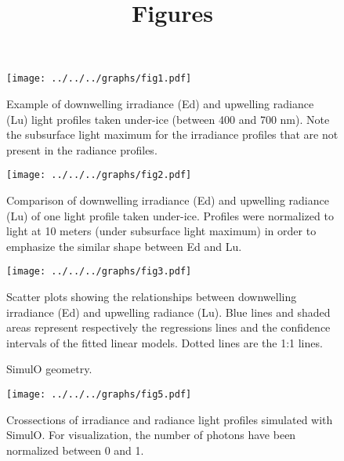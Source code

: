 \documentclass[12pt,a4paper]{scrartcl}
\title{Figures}
\date{}
\begin{document}
    \maketitle

     \begin{figure}[ht]
         \centering
         \texttt{[image: ../../../graphs/fig1.pdf]}
         \caption{Example of downwelling irradiance (Ed) and upwelling radiance (Lu) light profiles taken under-ice (between 400 and 700 nm). Note the subsurface light maximum for the irradiance profiles that are not present in the radiance profiles.}
     \end{figure}

    \clearpage
    \newpage

    \begin{figure}[ht]
        \centering
        \texttt{[image: ../../../graphs/fig2.pdf]}
        \caption{Comparison of downwelling irradiance (Ed) and upwelling radiance (Lu) of one light profile taken under-ice. Profiles were normalized to light at 10 meters (under subsurface light maximum) in order to emphasize the similar shape between Ed and Lu.}
    \end{figure}

    \clearpage
    \newpage

    \begin{figure}[ht]
        \centering
        \texttt{[image: ../../../graphs/fig3.pdf]}
        \caption{Scatter plots showing the relationships between downwelling irradiance (Ed) and upwelling radiance (Lu). Blue lines and shaded areas represent respectively the regressions lines and the confidence intervals of the fitted linear models. Dotted lines are the 1:1 lines.}
    \end{figure}

    \clearpage
    \newpage

    \begin{figure}[ht]
        \centering
        \caption{SimulO geometry.}
    \end{figure}

    \clearpage
    \newpage

    \begin{figure}[ht]
        \centering
        \texttt{[image: ../../../graphs/fig5.pdf]}
        \caption{Crossections of irradiance and radiance light profiles simulated with SimulO. For visualization, the number of photons have been normalized between 0 and 1.}
    \end{figure}
\end{document}
